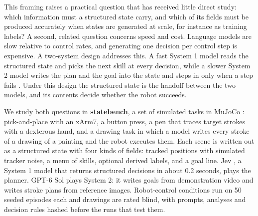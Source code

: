 \documentclass[11pt]{article}
\begin{document}
This framing raises a practical question that has received little direct study: which information must a structured state carry, and which of its fields must be produced accurately when states are generated at scale, for instance as training labels? A second, related question concerns speed and cost. Language models are slow relative to control rates, and generating one decision per control step is expensive. A two-system design addresses this. A fast System 1 model reads the structured state and picks the next skill at every decision, while a slower System 2 model writes the plan and the goal into the state and steps in only when a step fails \citep{kahneman, jev, helix, gr00t}. Under this design the structured state is the handoff between the two models, and its contents decide whether the robot succeeds.

We study both questions in \textbf{statebench}, a set of simulated tasks in MuJoCo \citep{mujoco}: pick-and-place with an xArm7, a button press, a pen that traces target strokes with a dexterous hand, and a drawing task in which a model writes every stroke of a drawing of a painting and the robot executes them. Each scene is written out as a structured state with four kinds of fields: tracked positions with simulated tracker noise, a menu of skills, optional derived labels, and a goal line. Jev \citep{jev}, a System 1 model that returns structured decisions in about 0.2 seconds, plays the planner. GPT-6 Sol \citep{sol} plays System 2: it writes goals from demonstration video and writes stroke plans from reference images. Robot-control conditions run on 50 seeded episodes each and drawings are rated blind, with prompts, analyses and decision rules hashed before the runs that test them.
\end{document}

